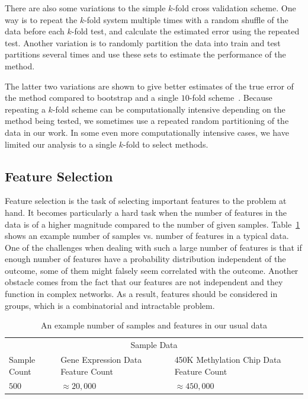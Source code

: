 There are also some variations to the simple $k$-fold cross validation scheme. One way is to repeat the $k$-fold system multiple times with a random shuffle of the data before each $k$-fold test, and calculate the estimated error using the repeated test. Another variation is to randomly partition the data into train and test partitions several times and use these sets to estimate the performance of the method.

The latter two variations are shown to give better estimates of the true error of the method compared to bootstrap and a single $10$-fold scheme~\cite{kim2009estimating, efron1994introduction}. Because repeating a $k$-fold scheme can be computationally intensive depending on the method being tested, we sometimes use a repeated random partitioning of the data in our work. In some even more computationally intensive cases, we have limited our analysis to a single $k$-fold to select methods.
  
\subsection{Feature Selection}
Feature selection is the task of selecting important features to the problem at hand. It becomes particularly a hard task when the number of features in the data is of a higher magnitude compared to the number of given samples. Table~\ref{tab:sample-sample-size} shows an example number of samples vs. number of features in a typical data. One of the challenges when dealing with such a large number of features is that if enough number of features have a probability distribution independent of the outcome, some of them might falsely seem correlated with the outcome. Another obstacle comes from the fact that our features are not independent and they function in complex networks. As a result, features should be considered in groups, which is a combinatorial and intractable problem.

\begin{table}[th!]
  \centering
  \begin{tabular}{p{} p{} p{}}
    \hline
    \multicolumn{3}{c}{Sample Data} \\
    \cline{1-3}
    Sample Count   & Gene Expression Data Feature Count & 450K Methylation Chip Data Feature Count \\
    \hline
    $500$      & $\approx 20,000$    & $\approx 450,000$   \\
    \hline
  \end{tabular}
  \caption{An example number of samples and features in our usual data}
  \label{tab:sample-sample-size}
\end{table}

